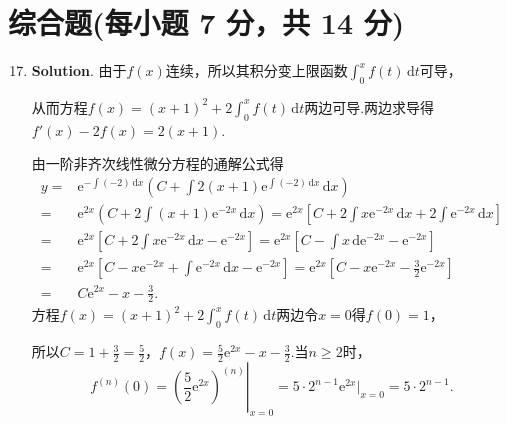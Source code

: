 \documentclass[../main.tex]{subfiles}
\begin{document}
\section{综合题(每小题 7 分，共 14 分)}
\begin{enumerate}
    \setcounter{enumi}{16}
    \item \textbf{Solution}. 由于$f(x)$连续，所以其积分变上限函数$\int_{0}^{x}
              f(t)\,\mathrm{d}t$可导，

          从而方程$f(x)=(x+1)^{2}+2\int_{0}^{x}f(t)\,\mathrm{d}t$两边可导.两边求导得$f'
              (x)-2f(x)=2(x+1)$.

          由一阶非齐次线性微分方程的通解公式得
          \[
              \begin{aligned}
                  y = {} & \mathrm{e}^{-\int\left(-2\right)\,\mathrm{d}x}\left(C+\int 2(x+1)\mathrm{e}^{\int\left(-2\right)\,\mathrm{d}x}\,\mathrm{d}x\right)                                                \\
                  = {}   & \mathrm{e}^{2x}\left(C+2\int (x+1)\mathrm{e}^{-2x}\,\mathrm{d}x\right) = \mathrm{e}^{2x}\left[C+2\int x\mathrm{e}^{-2x}\,\mathrm{d}x+2\int \mathrm{e}^{-2x}\,\mathrm{d}x\right]   \\
                  = {}   & \mathrm{e}^{2x}\left[C+2\int x\mathrm{e}^{-2x}\,\mathrm{d}x-\mathrm{e}^{-2x}\right] = \mathrm{e}^{2x}\left[C-\int x\,\mathrm{d}\mathrm{e}^{-2x}-\mathrm{e}^{-2x}\right]           \\
                  = {}   & \mathrm{e}^{2x}\left[C-x\mathrm{e}^{-2x}+\int \mathrm{e}^{-2x}\,\mathrm{d}x-\mathrm{e}^{-2x}\right] = \mathrm{e}^{2x}\left[C-x\mathrm{e}^{-2x}-\frac{3}{2}\mathrm{e}^{-2x}\right] \\
                  = {}   & C\mathrm{e}^{2x}-x-\frac{3}{2}.
              \end{aligned}
          \]
          方程$f(x)=(x+1)^{2}+2\int_{0}^{x}f(t)\,\mathrm{d}t$两边令$x=0$得$f(0)=1$，

          所以$C=1+\frac{3}{2}=\frac{5}{2}$，$f(x)=\frac{5}{2}\mathrm{e}^{2x}-x-\frac{3}{2}$.当$n\geq2$时，
          \[
              f^{(n)}(0)=\left.\left(\frac{5}{2}\mathrm{e}^{2x}\right)^{(n)}
              \right|_{x=0}=5\cdot 2^{n-1}\mathrm{e}^{2x}\bigg|_{x=0}=5\cdot 2^{n-1}.
          \]


\end{enumerate}
\end{document}

